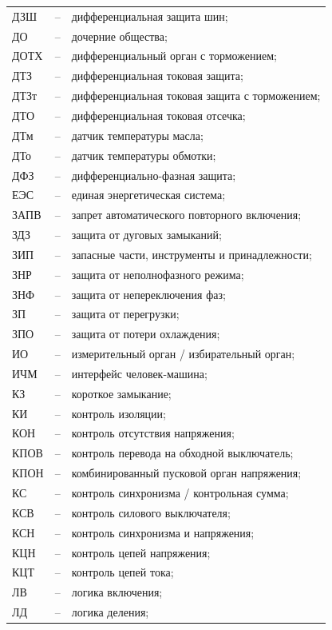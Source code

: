 \begin{longtable}{>{\raggedright\arraybackslash}m{2cm}>{\raggedright\arraybackslash}m{0.5cm}>{\raggedright\arraybackslash}m{20cm}}
ДЗШ & -- & дифференциальная защита шин; \\
ДО & -- & дочерние общества; \\
ДОТХ & -- & дифференциальный орган с торможением; \\
ДТЗ & -- & дифференциальная токовая защита; \\
ДТЗт & -- & дифференциальная токовая защита с торможением; \\
ДТО & -- & дифференциальная токовая отсечка; \\
ДТм & -- & датчик температуры масла; \\
ДТо & -- & датчик температуры обмотки; \\
ДФЗ & -- & дифференциально-фазная защита; \\
ЕЭС & -- & единая энергетическая система; \\
ЗАПВ & -- & запрет автоматического повторного включения; \\
ЗДЗ & -- & защита от дуговых замыканий; \\
ЗИП & -- & запасные части, инструменты и принадлежности; \\
ЗНР & -- & защита от неполнофазного режима; \\
ЗНФ & -- & защита от непереключения фаз; \\
ЗП & -- & защита от перегрузки; \\
ЗПО & -- & защита от потери охлаждения; \\
ИО & -- & измерительный орган / избирательный орган; \\
ИЧМ & -- & интерфейс человек-машина; \\
КЗ & -- & короткое замыкание; \\
КИ & -- & контроль изоляции; \\
КОН & -- & контроль отсутствия напряжения; \\
КПОВ & -- & контроль перевода на обходной выключатель; \\
КПОН & -- & комбинированный пусковой орган напряжения; \\
КС & -- & контроль синхронизма / контрольная сумма; \\
КСВ & -- & контроль силового выключателя; \\
КСН & -- & контроль синхронизма и напряжения; \\
КЦН & -- & контроль цепей напряжения; \\
КЦТ & -- & контроль цепей тока; \\
ЛВ & -- & логика включения; \\
ЛД & -- & логика деления; \\

\end{longtable}
